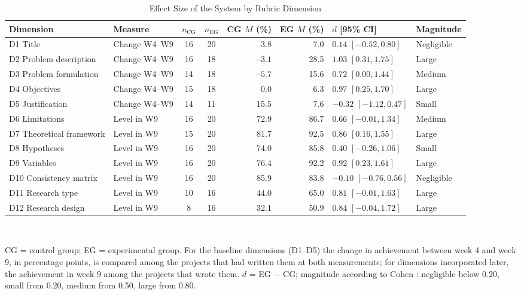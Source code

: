 \documentclass[journal]{IEEEtran}
\begin{document}
\begin{table}[!t]
\caption{Effect Size of the System by Rubric Dimension}
\label{tab:effect}
\centering
\footnotesize
\begin{tabular}{L{3.4cm}L{2.4cm}ccrrL{2.6cm}L{1.8cm}}
\toprule
Dimension & Measure & $n_{\mathrm{CG}}$ & $n_{\mathrm{EG}}$ & CG $M$ (\%) & EG $M$ (\%) & $d$ [95\% CI] & Magnitude \\
\midrule
D1 Title & Change W4--W9 & 16 & 20 & 3.8 & 7.0 & $0.14$ $[-0.52, 0.80]$ & Negligible \\
D2 Problem description & Change W4--W9 & 16 & 18 & $-3.1$ & 28.5 & $1.03$ $[0.31, 1.75]$ & Large \\
D3 Problem formulation & Change W4--W9 & 14 & 18 & $-5.7$ & 15.6 & $0.72$ $[0.00, 1.44]$ & Medium \\
D4 Objectives & Change W4--W9 & 15 & 18 & 0.0 & 6.3 & $0.97$ $[0.25, 1.70]$ & Large \\
D5 Justification & Change W4--W9 & 14 & 11 & 15.5 & 7.6 & $-0.32$ $[-1.12, 0.47]$ & Small \\
D6 Limitations & Level in W9 & 16 & 20 & 72.9 & 86.7 & $0.66$ $[-0.01, 1.34]$ & Medium \\
D7 Theoretical framework & Level in W9 & 15 & 20 & 81.7 & 92.5 & $0.86$ $[0.16, 1.55]$ & Large \\
D8 Hypotheses & Level in W9 & 16 & 20 & 74.0 & 85.8 & $0.40$ $[-0.26, 1.06]$ & Small \\
D9 Variables & Level in W9 & 16 & 20 & 76.4 & 92.2 & $0.92$ $[0.23, 1.61]$ & Large \\
D10 Consistency matrix & Level in W9 & 16 & 20 & 85.9 & 83.8 & $-0.10$ $[-0.76, 0.56]$ & Negligible \\
D11 Research type & Level in W9 & 10 & 16 & 44.0 & 65.0 & $0.81$ $[-0.01, 1.63]$ & Large \\
D12 Research design & Level in W9 & 8 & 16 & 32.1 & 50.9 & $0.84$ $[-0.04, 1.72]$ & Large \\
\bottomrule
\end{tabular}
\\[2pt]
\parbox{0.92\textwidth}{\raggedright\scriptsize CG = control group; EG = experimental group. For the baseline dimensions (D1--D5) the change in achievement between week 4 and week 9, in percentage points, is compared among the projects that had written them at both measurements; for dimensions incorporated later, the achievement in week 9 among the projects that wrote them. $d$ = EG $-$ CG; magnitude according to Cohen \cite{cohen1988}: negligible below 0.20, small from 0.20, medium from 0.50, large from 0.80.}
\end{table}
\end{document}
